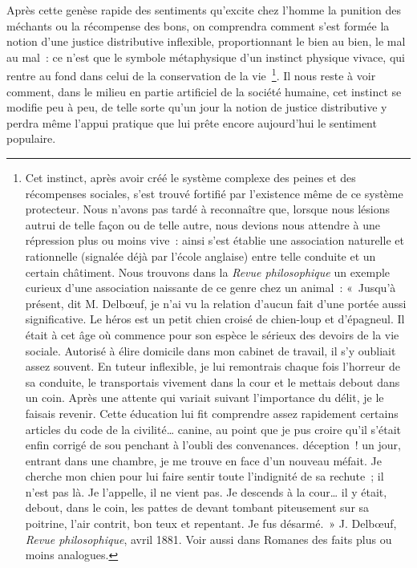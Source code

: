 \documentclass[french,twoside]{book} %
\begin{document}
Après cette genèse rapide des sentiments qu’excite chez l’homme la punition des méchants ou la récompense des bons, on comprendra comment s’est formée la notion d’une justice distributive inflexible, proportionnant le bien au bien, le mal au mal : ce n’est que le symbole métaphysique d’un instinct physique vivace, qui rentre au fond dans celui de la conservation de la vie \footnote{Cet instinct, après avoir créé le système complexe des peines et des récompenses sociales, s’est trouvé fortifié par l’existence même de ce système protecteur. Nous n’avons pas tardé à reconnaître que, lorsque nous lésions autrui de telle façon ou de telle autre, nous devions nous attendre à une répression plus ou moins vive : ainsi s’est établie une association naturelle et rationnelle (signalée déjà par l’école anglaise) entre telle conduite et un certain châtiment. Nous trouvons dans la \emph{Revue philosophique} un exemple curieux d’une association naissante de ce genre chez un animal : « Jusqu’à présent, dit M. Delbœuf, je n’ai vu la relation d’aucun fait d’une portée aussi significative. Le héros est un petit chien croisé de chien-loup et d’épagneul. Il était à cet âge où commence pour son espèce le sérieux des devoirs de la vie sociale. Autorisé à élire domicile dans mon cabinet de travail, il s’y oubliait assez souvent. En tuteur inflexible, je lui remontrais chaque fois l’horreur de sa conduite, le transportais vivement dans la cour et le mettais debout dans un coin. Après une attente qui variait suivant l’importance du délit, je le faisais revenir. Cette éducation lui fit comprendre assez rapidement certains articles du code de la civilité… canine, au point que je pus croire qu’il s’était enfin corrigé de sou penchant à l’oubli des convenances. déception ! un jour, entrant dans une chambre, je me trouve en face d’un nouveau méfait. Je cherche mon chien pour lui faire sentir toute l’indignité de sa rechute ; il n’est pas là. Je l’appelle, il ne vient pas. Je descends à la cour… il y était, debout, dans le coin, les pattes de devant tombant piteusement sur sa poitrine, l’air contrit, bon teux et repentant. Je fus désarmé. » J. Delbœuf, \emph{Revue philosophique}, avril 1881. Voir aussi dans Romanes des faits plus ou moins analogues.}. Il nous reste à voir comment, dans le milieu en partie artificiel de la société humaine, cet instinct se modifie peu à peu, de telle sorte qu’un jour la notion de justice distributive y perdra même l’appui pratique que lui prête encore aujourd’hui le sentiment populaire.\par
\end{document}
